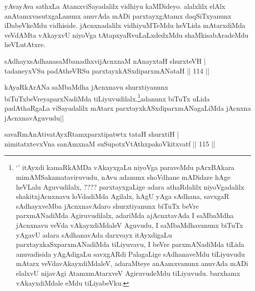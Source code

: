\begin{artha}
yAvayAva sathxLa AtamxviSayadalilx vidhiyu kaMDideyo. alalxlilx elAlx anAtamxvasutxgaLanunx anuvAda mADi parxtayxgAtamx daqSiTxyanunx iDabeVkeMdu vidhiside. jAcnxnadalilx vidhiyuMTeMdu heVLida mAtarxdiMda veVdAMta vAkayxvU niyoVga tAtapxyaRvuLaLxdedxMdu shaMkisabAradeMdu heVLutAtxre. 
\end{artha}


\begin{shl}
sAdhayxsAdhanasaMbanadhxvijAcnxnaM nAnayxtaH shurxteVH |\\
tadaneyxVSu padAtheVRSu parxtayxkASxdiparxmANataH \hfill || 114 ||
\end{shl}

\begin{artha}
kAyaRkArANa saMbaMdha jAcnxnavu shurxtiyanunx biTuTxbeVreyaparxNadiMda tiLiyuvudilalx.\footnote{`\stext' itAyxdi kamaRkAMDa vAkayxgaLu niyoVga paraveMdu pArxBAkara mimAMSakamataviruvudu, nAvu adanunx shoVdhane mADidare hAge heVLalu Aguvudilalx, ????  parxtayxgaLige adara athaRdalilx niyoVgadalilx shakitxjAcnxnavu loVdadiMda Agilalx, hAgU yAga sAdhana, savxgaR sAdhayxveMba jAcnxnavAdaro shurxtiyanunx biTuTx beVre parxmANadiMda Agiruvudilalx, adariMda ajAcnxtavAda I saMbaMdha jAcnxnavu veVda vAkayxdiMdaleV Aguvudu, I saMbaMdhavanunx biTuTx yAgavU adara sAdhanavAda darxvayx itAyxdigaLu parxtayxkaSxparxmANadiMda tiLiyuvavu, I beVre parxmANadiMda tiLida anuvadisida yAgAdigaLu savxgARdi PalagaLige sAdhanaveMdu tiLiyuvudu mAtarx veVdavAkayxdiMdaleV, adaraMteye anAamxvanunx anuvAda mADi elalxvU nijavAgi AtamxmAtarxveV AgiruvudeMdu tiLiyuvudu. barxhamx vAkayxdiMdale eMdu tiLiyabeVku.}adanunx biTuTx uLida padAthaRgaLa viSayadalilx mAtarx parxtayxkASxdiparxmANagaLiMda jAcnxna jAcnxnavAguvudu||
\end{artha}

\begin{shl}
savaRmAnAtivatAyxRtamxparxtipatwtx tataH shurxtiH |\\
nimitatxtevxVna sanAmxnaM suSupotxVtAthxpakoVkitxvatf \hfill || 115 ||
\end{shl}

